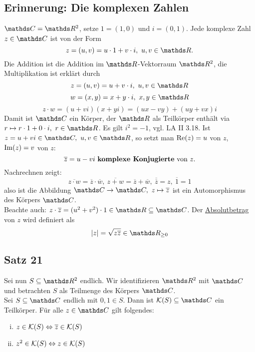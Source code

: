 \subsection{Erinnerung: Die komplexen Zahlen}
\label{sub:komplexe_zahlen}
$\C=\R^2$, setze $1=(1,0)$ und $i=(0,1)$. Jede komplexe  Zahl $z\in \C$ ist von der Form
\[
z=(u,v)=u\cdot 1+v\cdot i,~u,v\in \R.
\]
Die Addition ist die Addition im $\R$-Vektorraum $\R^2$, die Multiplikation ist erklärt durch
\[
z=(u,v)=u+v\cdot i,~u,v\in \R
\]
\[
w=(x,y)=x+y\cdot i,~x,y\in \R
\]
\[
z\cdot w=(u+vi)(x+yi)=(ux-vy)+(uy+vx)i
\]
Damit ist $\C$ ein Körper, der $\R$ als Teilkörper enthält via $r\mapsto r\cdot 1+ 0\cdot i,~r\in \R$.
Es gilt $i^2=-1$, vgl. LA II 3.18.
Ist $z=u+vi\in \C,~u,v\in\R$, so setzt man $\operatorname{Re}(z)=u$  von $z$, $\operatorname{Im}(z)=v$  von $z$:
\[
\overline{z}=u-vi\text{ \Index{komplexe Konjugierte} von } z.
\]
Nachrechnen zeigt:
\[
\overline{z\cdot w}=\overline{z}\cdot\overline{w},~\overline{z+w}=\overline{z}+\overline{w},~\overline{\overline{z}}=z,~\overline{1}=1
\]
also ist die Abbildung $\C\to\C,~z\mapsto \overline{z}$ ist ein Automorphismus des Körpers $\C$.\\
Beachte auch: $z\cdot \overline{z}=(u^2+v^2)\cdot 1\in\R\subseteq \C$.
Der \uline{Absolutbetrag} von $z$ wird definiert als
\[
\abs{z}=\sqrt{z\overline{z}}\in\R_{\ge0}
\]

\subsection{Satz 21}
\label{sub:satz_21}
Sei nun $S\subseteq \R^2$ endlich.
Wir identifizieren $\R^2$ mit $\C$ und betrachten $S$ als Teilmenge des Körpers $\C$.\\
Sei $S\subseteq \C$ endlich mit $0,1\in S$.
Dann ist $\mc{K}(S)\subseteq \C$ ein Teilkörper.
Für alle $z\in \C$ gilt folgendes:
\begin{enumerate}[(i)]
	\item $z\in\mathcal{K}(S)\Leftrightarrow \overline{z}\in \mathcal{K}(S)$
	\item $z^2\in\mathcal{K}(S)\Leftrightarrow z\in\mathcal{K}(S)$
\end{enumerate}

